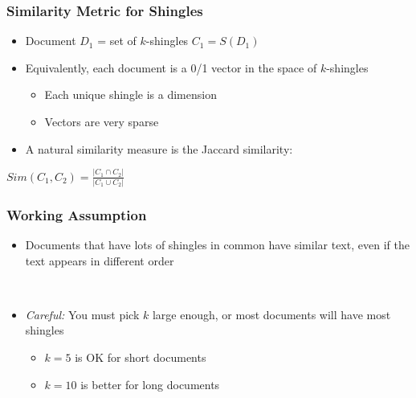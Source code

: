 \documentclass[svgnames]{beamer}
\begin{document}
  
\begin{frame} \frametitle{Similarity Metric for Shingles}

\begin{itemize}
\item Document $D_1$ = set of $k$-shingles $C_1=S(D_1)$
\item Equivalently, each document is a 0/1 vector in the space of $k$-shingles
   \begin{itemize}
   \item Each unique shingle is a dimension
   \item Vectors are very sparse
   \end{itemize}
\item A natural similarity measure is the Jaccard similarity:
\end{itemize}

\begin{block}{}
\begin{center}
$Sim(C_1, C_2) = \frac{|C_1 \cap C_2|}{|C_1 \cup C_2|}$
\end{center}
\end{block}
\end{frame}

  
\begin{frame} \frametitle{Working Assumption}

\begin{itemize}
\item Documents that have lots of shingles in common have similar text, even if the text appears in different order

~\\

\item \emph{Careful:} You must pick $k$ large enough, or most documents will have most shingles
   \begin{itemize}
   \item $k = 5$ is OK for short documents
   \item $k = 10$ is better for long documents
   \end{itemize}
\end{itemize}
\end{frame}

  
\end{document}
